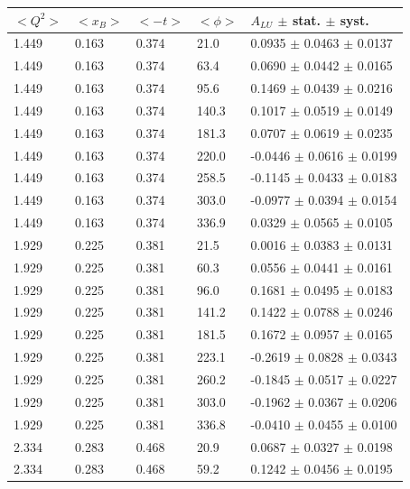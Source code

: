 \documentclass[aps,prc,preprint,superscriptaddress]{revtex4}
\begin{document}
\begin{table}[!h]
   \begin{center}
      \begin{tabular}{||l|l|l|l|l||}
         \hline
 $<Q^{2}>$ & $<x_{B}>$ & $<-t>$ & $<\phi>$ & $A_{LU}$ $\pm$ stat. $\pm$ syst.\\
         \hline
 1.449 & 0.163 & 0.374 &  21.0  &  0.0935 $\pm$ 0.0463  $\pm$  0.0137 \\ 
  1.449 & 0.163 & 0.374 &  63.4  &  0.0690 $\pm$ 0.0442  $\pm$  0.0165 \\ 
  1.449 & 0.163 & 0.374 &  95.6  &  0.1469 $\pm$ 0.0439  $\pm$  0.0216 \\ 
  1.449 & 0.163 & 0.374 & 140.3  &  0.1017 $\pm$ 0.0519  $\pm$  0.0149 \\ 
  1.449 & 0.163 & 0.374 & 181.3  &  0.0707 $\pm$ 0.0619  $\pm$  0.0235 \\ 
  1.449 & 0.163 & 0.374 & 220.0  & -0.0446 $\pm$ 0.0616  $\pm$  0.0199 \\ 
  1.449 & 0.163 & 0.374 & 258.5  & -0.1145 $\pm$ 0.0433  $\pm$  0.0183 \\ 
  1.449 & 0.163 & 0.374 & 303.0  & -0.0977 $\pm$ 0.0394  $\pm$  0.0154 \\ 
  1.449 & 0.163 & 0.374 & 336.9  &  0.0329 $\pm$ 0.0565  $\pm$  0.0105 \\ 
  \hline
  1.929 & 0.225 & 0.381 &  21.5  &  0.0016 $\pm$ 0.0383  $\pm$  0.0131 \\
  1.929 & 0.225 & 0.381 &  60.3  &  0.0556 $\pm$ 0.0441  $\pm$  0.0161 \\
  1.929 & 0.225 & 0.381 &  96.0  &  0.1681 $\pm$ 0.0495  $\pm$  0.0183 \\
  1.929 & 0.225 & 0.381 & 141.2  &  0.1422 $\pm$ 0.0788  $\pm$  0.0246 \\
  1.929 & 0.225 & 0.381 & 181.5  &  0.1672 $\pm$ 0.0957  $\pm$  0.0165 \\
  1.929 & 0.225 & 0.381 & 223.1  & -0.2619 $\pm$ 0.0828  $\pm$  0.0343 \\
  1.929 & 0.225 & 0.381 & 260.2  & -0.1845 $\pm$ 0.0517  $\pm$  0.0227 \\
  1.929 & 0.225 & 0.381 & 303.0  & -0.1962 $\pm$ 0.0367  $\pm$  0.0206 \\
  1.929 & 0.225 & 0.381 & 336.8  & -0.0410 $\pm$ 0.0455  $\pm$  0.0100 \\
  \hline
  2.334 & 0.283 & 0.468 &  20.9  &  0.0687 $\pm$ 0.0327  $\pm$  0.0198 \\
  2.334 & 0.283 & 0.468 &  59.2  &  0.1242 $\pm$ 0.0456  $\pm$  0.0195 \\

\end{tabular}
\end{center}
\end{table}
\end{document}
